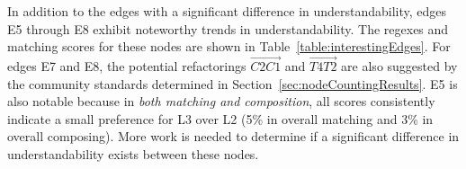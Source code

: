 

In addition to the edges with a significant difference in understandability,  edges E5 through E8 exhibit noteworthy trends in understandability.  The regexes and matching scores for these nodes are shown in Table~\ref{table:interestingEdges}.  For edges E7 and E8, the potential refactorings $\overrightarrow{C2 C1}$ and $\overrightarrow{T4 T2}$ are also suggested by the community standards determined in Section~\ref{sec:nodeCountingResults}.  E5 is also notable because in \emph{both matching and composition}, all scores consistently indicate a small preference for L3 over L2 (5\% in overall matching and 3\% in overall composing). \label{sec:compL2L3} More work is needed to determine if a significant difference in understandability exists between these nodes.


